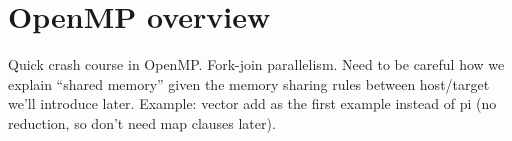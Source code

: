 
\chapter{OpenMP overview}
Quick crash course in OpenMP.
Fork-join parallelism.
Need to be careful how we explain “shared memory” given the memory sharing rules between host/target we’ll introduce later.
Example: vector add as the first example instead of pi (no reduction, so don’t need map clauses later).
